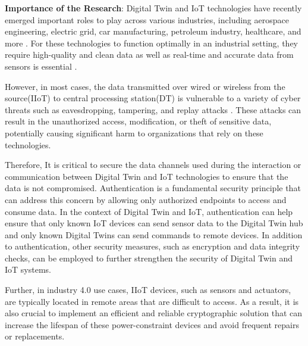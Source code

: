 \textbf{Importance of the Research}:
Digital Twin and IoT technologies have recently emerged important roles to play across various industries, including aerospace engineering, electric grid, car manufacturing, petroleum industry, healthcare, and more \cite{tao_digital_2019}. For these technologies to function optimally in an industrial setting, they require high-quality and clean data \cite{fuller_digital_2020} as well as real-time and accurate data from sensors is essential \cite{yuchenziqianzhangningtangApplicationDigitalTwin2022}. 

 However, in most cases, the data transmitted over wired or wireless from the source(IIoT) to central processing station(DT) is vulnerable to a variety of cyber threats such as eavesdropping, tampering, and replay attacks \cite{hussainiTaxonomySecurityDefense2022}. These attacks can result in the unauthorized access, modification, or theft of sensitive data, potentially causing significant harm to organizations that rely on these technologies.


Therefore, It is critical to secure the data channels used during the interaction or communication between Digital Twin and IoT technologies to ensure that the data is not compromised. Authentication is a fundamental security principle that can address this concern by allowing only authorized endpoints to access and consume data. In the context of Digital Twin and IoT, authentication can help ensure that only known IoT devices can send sensor data to the Digital Twin hub and only known Digital Twins can send commands to remote devices. In addition to authentication, other security measures, such as encryption and data integrity checks, can be employed to further strengthen the security of Digital Twin and IoT systems.

Further, in industry 4.0 use cases, IIoT devices, such as sensors and actuators, are typically located in remote areas that are difficult to access. As a result, it is also crucial to implement an efficient and reliable cryptographic solution that can increase the lifespan of these power-constraint devices and avoid frequent repairs or replacements.  


